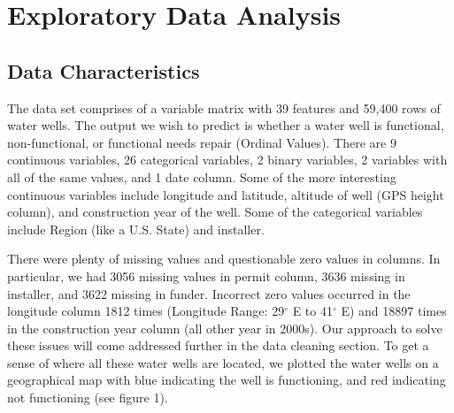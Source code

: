 \documentclass[10pt]{SelfArx} %
\begin{document}
\flushbottom %

\noindent \maketitle %


\tableofcontents %

\thispagestyle{empty} %


\section{Exploratory Data Analysis} %
\subsection{Data Characteristics}

The data set comprises of a variable matrix with 39 features and 59,400 rows of water wells. The output we wish to predict is whether a water well is functional, non-functional, or functional needs repair (Ordinal Values). There are 9 continuous variables, 26 categorical variables, 2 binary variables, 2 variables with all of the same values, and 1 date column. Some of the more interesting continuous variables include longitude and latitude, altitude of well (GPS height column), and construction year of the well. Some of the categorical variables include Region (like a U.S. State) and installer. 
\\[-1.5\baselineskip]
\break

There were plenty of missing values and questionable zero values in columns. In particular, we had 3056 missing values in permit column, 3636 missing in installer, and 3622 missing in funder. Incorrect zero values occurred in the longitude column 1812 times (Longitude Range: 29$^\circ$ E to 41$^\circ$ E) and 18897 times in the construction year column (all other year in 2000s). Our approach to solve these issues will come addressed further in the data cleaning section. To get a sense of where all these water wells are located, we plotted the water wells on a geographical map with blue indicating the well is functioning, and red indicating not functioning (see figure 1).
\end{document}
